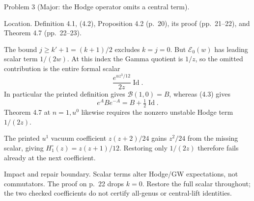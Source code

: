 \documentclass[10pt]{article}
\begin{document}
Problem 3 (Major: the Hodge operator omits a central term).\par
Location. Definition 4.1, (4.2), Proposition 4.2 (p. 20), its proof (pp. 21–22), and Theorem 4.7 (pp. 22–23).\par
The bound \(j\geq k'+1=(k+1)/2\) excludes \(k=j=0\). But \(\mathcal E_0(w)\) has leading scalar term \(1/(2w)\). At this index the Gamma quotient is \(1/z\), so the omitted contribution is the entire formal scalar \[\boxed{\frac{e^{uz^3/12}}{2z}\operatorname{Id}.}\] In particular the printed definition gives \(\mathcal B(1,0)=B\), whereas (4.3) gives \[e^A B e^{-A}=B+\tfrac12\operatorname{Id}.\] Theorem 4.7 at \(n=1,u^0\) likewise requires the nonzero unstable Hodge term \(1/(2z)\).\par
The printed \(u^1\) vacuum coefficient \(z(z+2)/24\) gains \(z^2/24\) from the missing scalar, giving \(H_1^\circ(z)=z(z+1)/12\). Restoring only \(1/(2z)\) therefore fails already at the next coefficient.\par
Impact and repair boundary. Scalar terms alter Hodge/GW expectations, not commutators. The proof on p. 22 drops \(k=0\). Restore the full scalar throughout; the two checked coefficients do not certify all-genus or central-lift identities.\par
\end{document}

